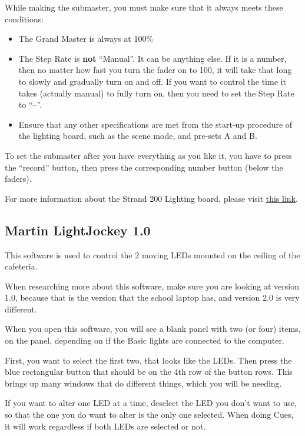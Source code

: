 \documentclass{article}
\begin{document}
While making the submaster, you must make sure that it always meets these conditions:
\begin{itemize}
    \item The Grand Master is always at 100\%
    \item The Step Rate is \textbf{not} “Manual”. It can be anything else. If it is a number, then no matter how fast you turn the fader on to 100, it will take that long to slowly and gradually turn on and off. If you want to control the time it takes (actually manual) to fully turn on, then you need to set the Step Rate to “--”.
    \item Ensure that any other specifications are met from the start-up procedure of the lighting board, such as the scene mode, and pre-sets A and B.
\end{itemize}

To set the submaster after you have everything as you like it, you have to press the “record” button, then press the corresponding number button (below the faders). 

For more information about the Strand 200 Lighting board, please visit \href{http://www.theatrecrafts.com/archive/documents/200series_console_manual.pdf}{\underline{this link}}.

\subsection{Martin LightJockey 1.0}
This software is used to control the 2 moving LEDs mounted on the ceiling of the cafeteria.

When researching more about this software, make sure you are looking at version 1.0, because that is the version that the school laptop has, and version 2.0 is very different.

When you open this software, you will see a blank panel with two (or four) items, on the panel, depending on if the Basic lights are connected to the computer.

First, you want to select the first two, that looks like the LEDs. Then press the blue rectangular button that should be on the 4th row of the button rows. This brings up many windows that do different things, which you will be needing.

If you want to alter one LED at a time, deselect the LED you don’t want to use, so that the one you do want to alter is the only one selected. When doing Cues, it will work regardless if both LEDs are selected or not.
\end{document}
